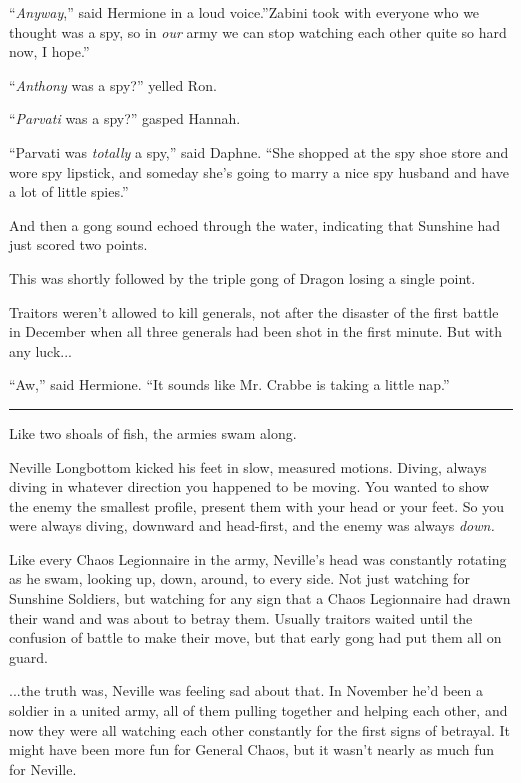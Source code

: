 ``\emph{Anyway},'' said Hermione in a loud voice.''Zabini took with
everyone who we thought was a spy, so in \emph{our} army we can stop
watching each other quite so hard now, I hope.''

``\emph{Anthony} was a spy?'' yelled Ron.

``\emph{Parvati} was a spy?'' gasped Hannah.

``Parvati was \emph{totally} a spy,'' said Daphne. ``She shopped at the
spy shoe store and wore spy lipstick, and someday she's going to marry a
nice spy husband and have a lot of little spies.''

And then a gong sound echoed through the water, indicating that Sunshine
had just scored two points.

This was shortly followed by the triple gong of Dragon losing a single
point.

Traitors weren't allowed to kill generals, not after the disaster of the
first battle in December when all three generals had been shot in the
first minute. But with any luck...

``Aw,'' said Hermione. ``It sounds like Mr. Crabbe is taking a little
nap.''

\begin{center}\rule{3in}{0.4pt}\end{center}

Like two shoals of fish, the armies swam along.

Neville Longbottom kicked his feet in slow, measured motions. Diving,
always diving in whatever direction you happened to be moving. You
wanted to show the enemy the smallest profile, present them with your
head or your feet. So you were always diving, downward and head-first,
and the enemy was always \emph{down.}

Like every Chaos Legionnaire in the army, Neville's head was constantly
rotating as he swam, looking up, down, around, to every side. Not just
watching for Sunshine Soldiers, but watching for any sign that a Chaos
Legionnaire had drawn their wand and was about to betray them. Usually
traitors waited until the confusion of battle to make their move, but
that early gong had put them all on guard.

...the truth was, Neville was feeling sad about that. In November
he'd been a soldier in a united army, all of them pulling together and
helping each other, and now they were all watching each other constantly
for the first signs of betrayal. It might have been more fun for General
Chaos, but it wasn't nearly as much fun for Neville.

